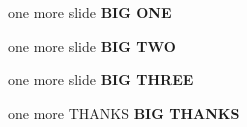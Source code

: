 \documentclass[notheorems,12pt]{beamer}
\begin{document}
\begin{frame}{one more slide}
    \centering
    \Huge\textbf{BIG ONE}
\end{frame}
\begin{frame}{one more slide}
    \centering
    \Huge\textbf{BIG TWO}
\end{frame}
\begin{frame}{one more slide}
    \centering
    \Huge\textbf{BIG THREE}
\end{frame}
\begin{frame}{one more THANKS}
    \centering
    \Huge\textbf{BIG THANKS}
\end{frame}
\end{document}
